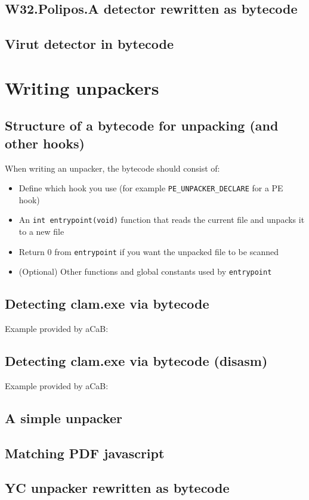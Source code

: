 \subsection{W32.Polipos.A detector rewritten as bytecode}
\subsection{Virut detector in bytecode}
\section{Writing unpackers}
\label{sec:unpacker}
\subsection{Structure of a bytecode for unpacking (and other hooks)}
When writing an unpacker, the bytecode should consist of:
\begin{itemize}
 \item Define which hook you use (for example \verb+PE_UNPACKER_DECLARE+ for a PE hook)
 \item An \verb+int entrypoint(void)+ function that reads the current file and unpacks it to a new file
 \item Return 0 from \verb+entrypoint+ if you want the unpacked file to be scanned %
 \item (Optional) Other functions and global constants used by \verb+entrypoint+
\end{itemize}

\subsection{Detecting clam.exe via bytecode}
Example provided by aCaB:
\subsection{Detecting clam.exe via bytecode (disasm)}
Example provided by aCaB:

\label{prg:matchclamexedisasm}
\subsection{A simple unpacker}
\subsection{Matching PDF javascript}

\subsection{YC unpacker rewritten as bytecode}
